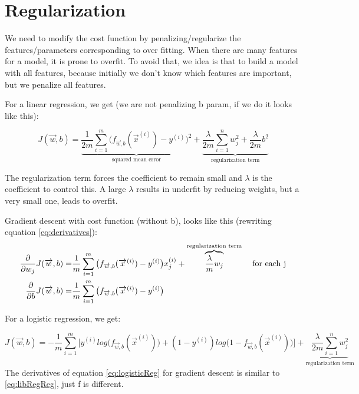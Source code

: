 \documentclass[12pt]{report}
\begin{document}
\section{Regularization}
\label{sec:regularization}

We need to modify the cost function by penalizing/regularize the features/parameters corresponding to over fitting.
When there are many features for a model, it is prone to overfit. To avoid that, we idea is that to build a model with all features, because initially we don't know which features are important, but we penalize all features.

For a linear regression, we get (we are not penalizing b param, if we do it looks like this):

\begin{equation}
J(\overrightarrow{w},b) = \underbrace{  \frac{1}{2m} \sum_{i=1}^{m} \big( f_{\overrightarrow{w},b} (\overrightarrow{x}^{(i)}) - y^{(i)} \big) ^2}_\text{squared mean error} + \underbrace{ \frac{\lambda}{2m} \sum_{i=1}^n w_j^2 + \frac{\lambda}{2m} b^2}_\text{regularization term}
\end{equation}

The regularization term forces the coefficient to remain small and $\lambda$ is the coefficient to control this. A large $\lambda$ results in underfit by reducing weights, but a very small one, leads to overfit.

Gradient descent with cost function (without b), looks like this (rewriting equation \ref{eq:derivatives}):
\begin{equation}
\label{eq:libRegReg}
  \begin{split}
    \frac{\partial}{\partial w_j} J(\overrightarrow{w},b) =&  \frac{1}{m} \sum_{i=1}^{m} \big( f_{\overrightarrow{w},b} (\overrightarrow{x}^{(i)}) - y^{(i)} \big) x_j^{(i)} + \overbrace{\frac{\lambda}{m} w_j}^\text{regularization term} \text{\: \: for each j} \\
    \frac{\partial}{\partial b} J(\overrightarrow{w},b)   =& \frac{1}{m} \sum_{i=1}^{m} \big( f_{\overrightarrow{w},b} (\overrightarrow{x}^{(i)})  - y^{(i)} \big)
  \end{split}
\end{equation}

For a logistic regression, we get:

\begin{equation}
  J(\overrightarrow{w},b)   = -\frac{1}{m} \sum_{i=1}^{m} \big[ y^{(i)} log\big( f_{\overrightarrow{w},b} (\overrightarrow{x}^{(i)}) \big) + (1-y^{(i)}) log\big(1-f_{\overrightarrow{w},b} (\overrightarrow{x}^{(i)}) \big)  \big]+ \underbrace{ \frac{\lambda}{2m} \sum_{i=1}^n w_j^2}_\text{regularization term}
\label{eq:logisticReg}
\end{equation}
The derivatives of equation \ref{eq:logisticReg} for gradient descent is similar to \ref{eq:libRegReg}, just f is different.
\end{document}
